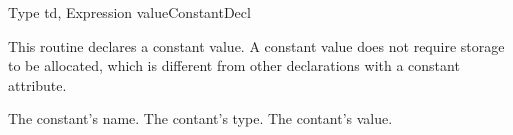 	{Type td, Expression value}{ConstantDecl}
\begin{functionality}
This routine declares a constant value.  A constant value does not
require storage to be allocated, which is different from other
declarations with a constant attribute.

\begin{Parameters}
 The constant's name.
 The contant's type.
 The contant's value.
\end{Parameters}
\end{functionality}









